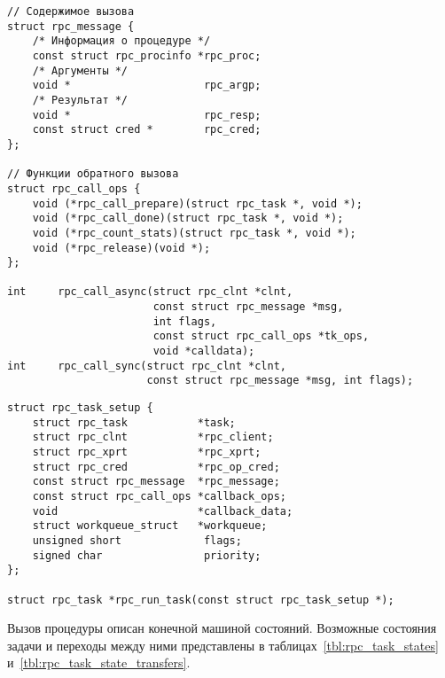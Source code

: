 \begin{lstlisting}[caption={Прототип функций вызова удаленных процедур}, label={lst:rpc_call}]
// Содержимое вызова
struct rpc_message {
    /* Информация о процедуре */
    const struct rpc_procinfo *rpc_proc;
    /* Аргументы */
    void *                     rpc_argp;
    /* Результат */
    void *                     rpc_resp;
    const struct cred *        rpc_cred;
};

// Функции обратного вызова
struct rpc_call_ops {
    void (*rpc_call_prepare)(struct rpc_task *, void *);
    void (*rpc_call_done)(struct rpc_task *, void *);
    void (*rpc_count_stats)(struct rpc_task *, void *);
    void (*rpc_release)(void *);
};

int     rpc_call_async(struct rpc_clnt *clnt,
                       const struct rpc_message *msg,
                       int flags,
                       const struct rpc_call_ops *tk_ops,
                       void *calldata);
int     rpc_call_sync(struct rpc_clnt *clnt,
                      const struct rpc_message *msg, int flags);
\end{lstlisting}

\begin{lstlisting}[caption={Структура \code{rpc_task}}, label={lst:rpc_task}]
struct rpc_task_setup {
    struct rpc_task           *task;
    struct rpc_clnt           *rpc_client;
    struct rpc_xprt           *rpc_xprt;
    struct rpc_cred           *rpc_op_cred;
    const struct rpc_message  *rpc_message;
    const struct rpc_call_ops *callback_ops;
    void                      *callback_data;
    struct workqueue_struct   *workqueue;
    unsigned short             flags;
    signed char                priority;
};

struct rpc_task *rpc_run_task(const struct rpc_task_setup *);
\end{lstlisting}

Вызов процедуры описан конечной машиной состояний. Возможные состояния задачи и
переходы между ними представлены в таблицах~\ref{tbl:rpc_task_states}
и~\ref{tbl:rpc_task_state_transfers}.

\clearpage

